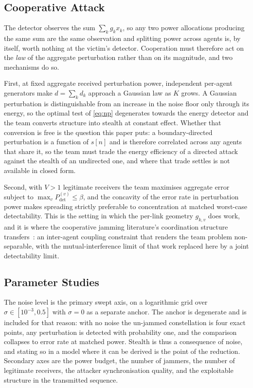 \subsection{Cooperative Attack}
\label{sec:system:coop}

The detector observes the sum $\sum_k g_k x_k$, so any two power allocations producing the same sum are the same observation and splitting power across agents is, by itself, worth nothing at the victim's detector.
Cooperation must therefore act on the \emph{law} of the aggregate perturbation rather than on its magnitude, and two mechanisms do so.

First, at fixed aggregate received perturbation power, independent per-agent generators make $d = \sum_k d_k$ approach a Gaussian law as $K$ grows.
A Gaussian perturbation is distinguishable from an increase in the noise floor only through its energy, so the optimal test of \eqref{eq:np} degenerates towards the energy detector and the team converts structure into stealth at constant effect.
Whether that conversion is free is the question this paper puts: a boundary-directed perturbation is a function of $s[n]$ and is therefore correlated across any agents that share it, so the team must trade the energy efficiency of a directed attack against the stealth of an undirected one, and where that trade settles is not available in closed form.

Second, with $V > 1$ legitimate receivers the team maximises aggregate error subject to $\max_v P_{\mathrm{det}}^{(v)} \le \beta$, and the concavity of the error rate in perturbation power makes spreading strictly preferable to concentration at matched worst-case detectability.
This is the setting in which the per-link geometry $g_{k,v}$ does work, and it is where the cooperative jamming literature's coordination structure transfers~\cite{valianti2024cooperative}: an inter-agent coupling constraint that renders the team problem non-separable, with the mutual-interference limit of that work replaced here by a joint detectability limit.

\subsection{Parameter Studies}
\label{sec:system:params}

The noise level is the primary swept axis, on a logarithmic grid over $\sigma \in [10^{-3}, 0.5]$ with $\sigma = 0$ as a separate anchor.
The anchor is degenerate and is included for that reason: with no noise the un-jammed constellation is four exact points, any perturbation is detected with probability one, and the comparison collapses to error rate at matched power.
Stealth is thus a consequence of noise, and stating so in a model where it can be derived is the point of the reduction.
Secondary axes are the power budget, the number of jammers, the number of legitimate receivers, the attacker synchronisation quality, and the exploitable structure in the transmitted sequence.


